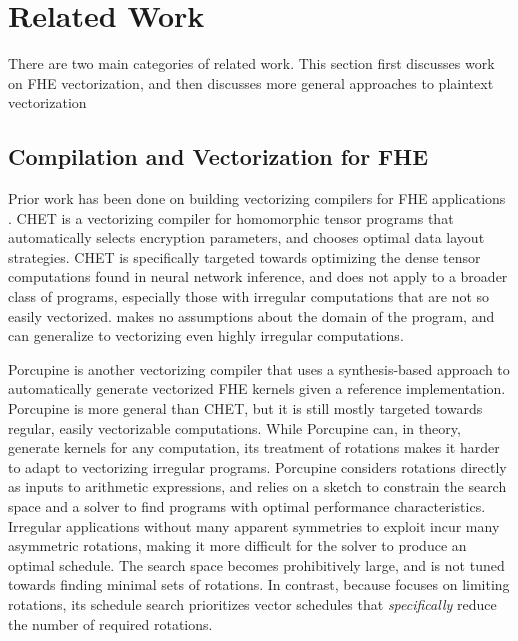 \section{Related Work}\label{sec:related-work}
There are two main categories of related work. This section first discusses work on FHE vectorization, and then discusses more general approaches to plaintext vectorization 

\subsection{Compilation and Vectorization for FHE}
Prior work has been done on building vectorizing compilers for FHE applications \cite{CHET, Porcupine}.
CHET \cite{CHET} is a vectorizing compiler for homomorphic tensor programs that automatically selects encryption parameters, and chooses optimal data layout strategies.
CHET is specifically targeted towards optimizing the dense tensor computations found in neural network inference, and does not apply to a broader class of programs, especially those with irregular computations that are not so easily vectorized.
\system makes no assumptions about the domain of the program, and can generalize to vectorizing even highly irregular computations.

Porcupine \cite{Porcupine} is another vectorizing compiler that uses a synthesis-based approach to automatically generate vectorized FHE kernels given a reference implementation.
Porcupine is more general than CHET, but it is still mostly targeted towards regular, easily vectorizable computations.
While Porcupine can, in theory, generate kernels for any computation, its treatment of rotations makes it harder to adapt to vectorizing irregular programs.
Porcupine considers rotations directly as inputs to arithmetic expressions, and relies on a sketch to constrain the search space and a solver to find programs with optimal performance characteristics.
Irregular applications without many apparent symmetries to exploit incur many asymmetric rotations, making it more difficult for the solver to produce an optimal schedule. The search space becomes prohibitively large, and is not tuned towards finding minimal sets of rotations.
In contrast, because \system focuses on limiting rotations, its schedule search prioritizes vector schedules that {\em specifically} reduce the number of required rotations. 

